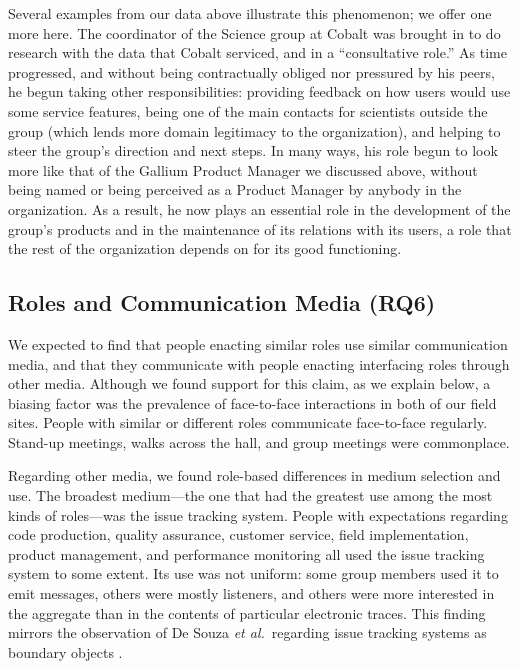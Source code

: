 \documentclass[10pt, conference, compsocconf]{IEEEtran}
\begin{document}
Several examples from our data above illustrate this phenomenon; we offer one more here. The coordinator of the Science group at Cobalt was brought in to do research with the data that Cobalt serviced, and in a ``consultative role.'' As time progressed, and without being contractually obliged nor pressured by his peers, he begun taking other responsibilities: providing feedback on how users would use some service features, being one of the main contacts for scientists outside the group (which lends more domain legitimacy to the organization), and helping to steer the group's direction and next steps. In many ways, his role begun to look more like that of the Gallium Product Manager we discussed above, without being named or being perceived as a Product Manager by anybody in the organization. As a result, he now plays an essential role in the development of the group's products and in the maintenance of its relations with its users, a role that the rest of the organization depends on for its good functioning.



\subsection{Roles and Communication Media (RQ6)}

We expected to find that people enacting similar roles use similar communication media, and that they communicate with people enacting interfacing roles through other media. Although we found support for this claim, as we explain below, a biasing factor was the prevalence of face-to-face interactions in both of our field sites. People with similar or different roles communicate face-to-face regularly. Stand-up meetings, walks across the hall, and group meetings were commonplace.

Regarding other media, we found role-based differences in medium selection and use. The broadest medium---the one that had the greatest use among the most kinds of roles---was the issue tracking system. People with expectations regarding code production, quality assurance, customer service, field implementation, product management, and performance monitoring all used the issue tracking system to some extent. Its use was not uniform: some group members used it to emit messages, others were mostly listeners, and others were more interested in the aggregate than in the contents of particular electronic traces. This finding mirrors the observation of De Souza \emph{et al.}\ regarding issue tracking systems as boundary objects \cite{deSouza2003}.
\end{document}
